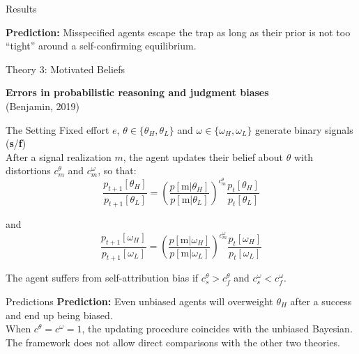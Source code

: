 \documentclass[aspectratio=169]{beamer}
\begin{document}
\begin{frame}{Results}

    \textbf{Prediction:} Misspecified agents escape the trap as long as their prior is not too ``tight'' around a self-confirming equilibrium.
  
\end{frame}

\begin{frame}{Theory 3: Motivated Beliefs}
    
    \Large\textbf{Errors in probabilistic reasoning and judgment biases}\\
    (Benjamin, 2019)\\
    
\end{frame}

\begin{frame}{The Setting}
    Fixed effort $e$, $\theta \in \{\theta_H, \theta_L\}$ and $\omega \in \{\omega_H, \omega_L\}$ generate binary signals (\textbf{s}/\textbf{f})\\
    \bigskip
    After a signal realization $m$, the agent updates their belief about $\theta$ with distortions $c_m^\theta$ and $c_m^\omega$, so that:\\

        $$\frac{p_{t+1}[\theta_H]}{p_{t+1}[\theta_L]} = \left(\frac{p[\text{m}|\theta_H]}{p[\text{m}|\theta_L]}\right)^{c_m^\theta}\frac{p_t[\theta_H]}{p_t[\theta_L]}$$
    
    and
        $$\frac{p_{t+1}[\omega_H]}{p_{t+1}[\omega_L]} = \left(\frac{p[\text{m}|\omega_H]}{p[\text{m}|\omega_L]}\right)^{c_m^\omega}\frac{p_t[\omega_H]}{p_t[\omega_L]}$$
    
    \bigskip
    The agent suffers from self-attribution bias if $c_s^\theta >c_f^\theta$ and $c_s^\omega < c_f^\omega$.
\end{frame}

\begin{frame}{Predictions}
    \textbf{Prediction:} Even unbiased agents will overweight $\theta_H$ after a success and end up being biased.\\
    \bigskip
    When $c^\theta = c^\omega = 1$, the updating procedure coincides with the unbiased Bayesian.\\
    
    \bigskip
    The framework does not allow direct comparisons with the other two theories.\\
    
    
\end{frame}
\end{document}
